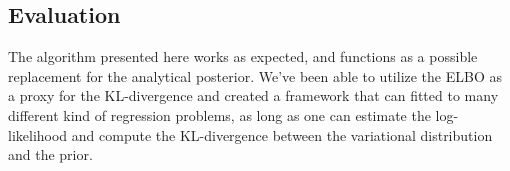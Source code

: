 \subsection{Evaluation}
The algorithm presented here works as expected, and functions as a possible replacement for the analytical posterior.
We've been able to utilize the ELBO as a proxy for the KL-divergence and created a framework that can fitted to many different kind of regression problems, 
as long as one can estimate the log-likelihood and compute the KL-divergence between the variational distribution and the prior.

